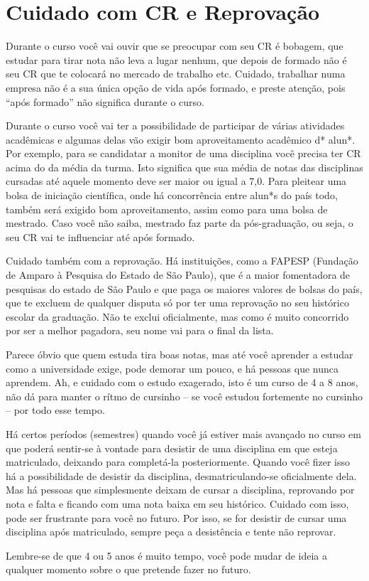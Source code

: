 
\section{Cuidado com CR e Reprovação}

Durante o curso você vai ouvir que se preocupar com seu CR é bobagem, que
estudar para tirar nota não leva a lugar nenhum, que depois de formado não é
seu CR que te colocará no mercado de trabalho etc. Cuidado, trabalhar numa
empresa não é a sua única opção de vida após formado, e preste atenção, pois
``após formado'' não significa durante o curso.

Durante o curso você vai ter a possibilidade de participar de várias atividades
acadêmicas e algumas delas vão exigir bom aproveitamento acadêmico d* alun*.
Por exemplo, para se candidatar a monitor de uma disciplina você precisa ter CR
acima do da média da turma. Isto significa que sua média de notas das
disciplinas cursadas até aquele momento deve ser maior ou igual a 7,0. Para
pleitear uma bolsa de iniciação científica, onde há concorrência entre alun*s
do país todo, também será exigido bom aproveitamento, assim como para uma bolsa
de mestrado. Caso você não saiba, mestrado faz parte da pós-graduação, ou seja,
o seu CR vai te influenciar até após formado.

Cuidado também com a reprovação. Há instituições, como a FAPESP (Fundação de
Amparo à Pesquisa do Estado de São Paulo), que é a maior fomentadora de
pesquisas do estado de São Paulo e que paga os maiores valores de bolsas do
país, que te excluem de qualquer disputa só por ter uma reprovação no seu
histórico escolar da graduação. Não te exclui oficialmente, mas como é muito
concorrido por ser a melhor pagadora, seu nome vai para o final da lista.

Parece óbvio que quem estuda tira boas notas, mas até você aprender a estudar
como a universidade exige, pode demorar um pouco, e há pessoas que nunca
aprendem. Ah, e cuidado com o estudo exagerado, isto é um curso de 4 a 8 anos,
não dá para manter o rítmo de cursinho -- se você estudou fortemente no
cursinho -- por todo esse tempo.

Há certos períodos (semestres) quando você já estiver mais avançado no curso em
que poderá sentir-se à vontade para desistir de uma disciplina em que esteja
matriculado, deixando para completá-la posteriormente. Quando você fizer isso
há a possibilidade de desistir da disciplina, desmatriculando-se oficialmente
dela. Mas há pessoas que simplesmente deixam de cursar a disciplina, reprovando
por nota e falta e ficando com uma nota baixa em seu histórico. Cuidado com
isso, pode ser frustrante para você no futuro. Por isso, se for desistir de
cursar uma disciplina após matriculado, sempre peça a desistência e tente não
reprovar.

Lembre-se de que 4 ou 5 anos é muito tempo, você pode mudar de ideia a qualquer
momento sobre o que pretende fazer no futuro.

